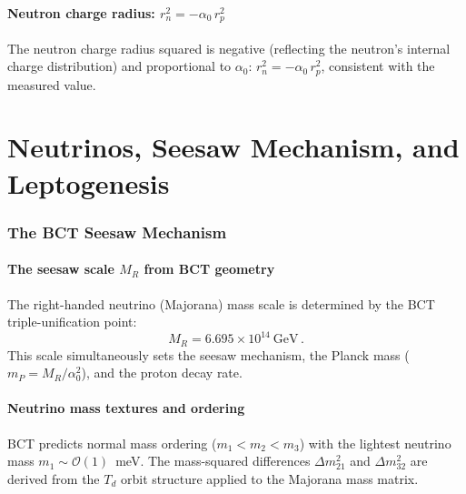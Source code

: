 \documentclass[review,number,sort&compress]{elsarticle}
\newcommand{\azero}{\alpha_0}
\newcommand{\MR}{M_R}
\newcommand{\mP}{m_P}
\newcommand{\Td}{T_d}
\begin{document}
\subsection{Neutron charge radius: $r_n^2 = -\azero\,r_p^2$}

The neutron charge radius squared is negative (reflecting the
neutron's internal charge distribution) and proportional to $\azero$:
$r_n^2 = -\azero\,r_p^2$, consistent with the measured value.



\part{Neutrinos, Seesaw Mechanism, and Leptogenesis}
\label{part:neutrinos}

\section{The BCT Seesaw Mechanism}
\label{sec:seesaw}

\subsection{The seesaw scale $\MR$ from BCT geometry}

The right-handed neutrino (Majorana) mass scale is determined by the
BCT triple-unification point:
\begin{equation}
  \MR = 6.695 \times 10^{14}~\text{GeV}\,.
  \label{eq:MR}
\end{equation}
This scale simultaneously sets the seesaw mechanism, the Planck mass
($\mP = \MR/\azero^2$), and the proton decay rate.

\subsection{Neutrino mass textures and ordering}

BCT predicts normal mass ordering ($m_1 < m_2 < m_3$) with the
lightest neutrino mass $m_1 \sim \mathcal{O}(1)$~meV. The
mass-squared differences $\Delta m_{21}^2$ and $\Delta m_{32}^2$
are derived from the $\Td$ orbit structure applied to the Majorana
mass matrix.
\end{document}
